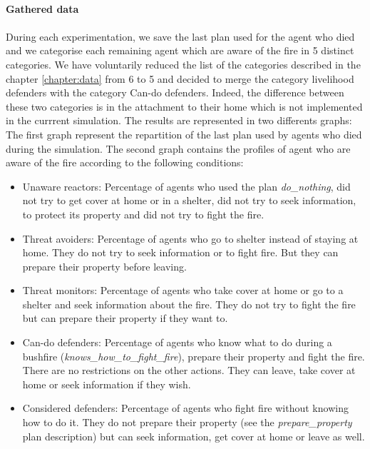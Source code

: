 \documentclass[12pt, a4paper]{memoir} %
\begin{document}
	\paragraph{}
	\textbf{Gathered data}
	\paragraph{}

	During each experimentation, we save the last plan used for the agent who died and we categorise each remaining agent which are
	aware of the fire in 5 distinct categories. We have voluntarily reduced the list of the categories described in the chapter \ref{chapter:data}
	from 6 to 5 and decided to merge the category livelihood defenders with the category Can-do defenders. Indeed, the difference between these two
	categories is in the attachment to their home which is not implemented in the currrent simulation.
	\newline
	The results are represented in two differents graphs: The first graph represent the repartition of the last plan used by agents who
	died during the simulation. The second graph contains the profiles of agent who are aware of the fire according to the following
	conditions:
	\begin{itemize}
		\item Unaware reactors: Percentage of agents who used the plan \textit{do\_nothing}, did not try to get cover at home or in a shelter,
		 did not try to seek information, to protect its property and did not try to fight the fire.
		\item Threat avoiders: Percentage of agents who go to shelter instead of staying at home. They do not try to seek information or to fight fire. But they can
		prepare their property before leaving.
		\item Threat monitors: Percentage of agents who take cover at home or go to a shelter and seek information about the fire. They do not try to fight the fire
		but can prepare their property if they want to.
		\item Can-do defenders: Percentage of agents who know what to do during a bushfire (\textit{knows\_how\_to\_fight\_fire}), prepare their property and fight the fire.
		There are no restrictions on the other actions. They can leave, take cover at home or seek information if they wish.
		\item Considered defenders: Percentage of agents who fight fire without knowing how to do it. They do not prepare their property (see the \textit{prepare\_property}
		plan description) but can seek information, get cover at home or leave as well.
	\end{itemize}
\end{document}
